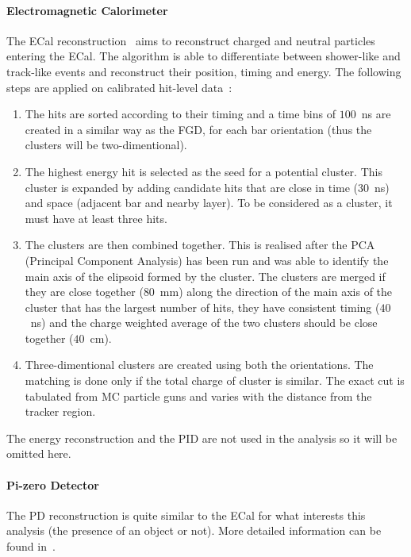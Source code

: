 \paragraph{Electromagnetic Calorimeter}
\label{subpar:ecalreco}
The \Gls{ECal} reconstruction~\cite{TN072} aims to reconstruct charged
and neutral particles entering the \Gls{ECal}. The algorithm is able
to differentiate between shower-like and track-like events and
reconstruct their position, timing and energy. The following steps are
applied on calibrated hit-level data~\cite{DomBrailsford2016}:
\begin{enumerate}[noitemsep,topsep=0pt]
\item The hits are sorted according to their timing and a time
  bins of $100$~ns are created in a similar way as the \Gls{FGD}, for
  each bar orientation (thus the clusters will be two-dimentional).
\item The highest energy hit is selected as the seed for a potential
  cluster. This cluster is expanded by adding candidate hits that are
  close in time ($30$~ns) and space (adjacent bar and nearby
  layer). To be considered as a cluster, it must have at least three
  hits.
\item The clusters are then combined together. This is realised
  after the PCA (Principal Component Analysis) has been run and was
  able to identify the main axis of the elipsoid formed by the
  cluster. The clusters are merged if they are close together
  ($80$~mm) along the direction of the main axis of the cluster that
  has the largest number of hits, they have consistent timing
  ($40$~ns) and the charge weighted average of the two clusters should
  be close together ($40$~cm).
\item Three-dimentional clusters are created using both the
  orientations. The matching is done only if the total charge of
  cluster is similar. The exact cut is tabulated from \Gls{MC}
  particle guns and varies with the distance from the tracker
  region.
\end{enumerate}
The energy reconstruction and the \Gls{PID} are not used in the
analysis so it will be omitted here.

\paragraph{Pi-zero Detector}
\label{subpar:podreco}
The \Gls{PD} reconstruction is quite similar to the \Gls{ECal} for
what interests this analysis (the presence of an object or not). More
detailed information can be found in~\cite{TN072}.

